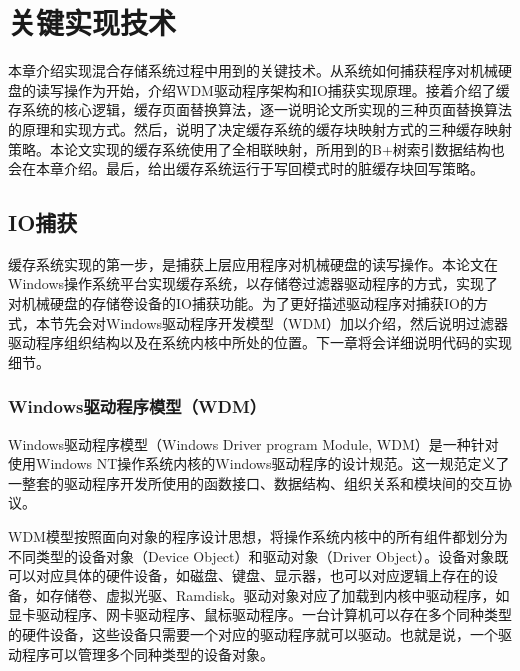 
\chapter{关键实现技术}
\label{cha:key_tech}

本章介绍实现混合存储系统过程中用到的关键技术。从系统如何捕获程序对机械硬盘的读写操作为开始，介绍WDM驱动程序架构和IO捕获实现原理。接着介绍了缓存系统的核心逻辑，缓存页面替换算法，逐一说明论文所实现的三种页面替换算法的原理和实现方式。然后，说明了决定缓存系统的缓存块映射方式的三种缓存映射策略。本论文实现的缓存系统使用了全相联映射，所用到的B+树索引数据结构也会在本章介绍。最后，给出缓存系统运行于写回模式时的脏缓存块回写策略。

\section{IO捕获}
\label{sec:capture_io}

缓存系统实现的第一步，是捕获上层应用程序对机械硬盘的读写操作。本论文在Windows操作系统平台实现缓存系统，以存储卷过滤器驱动程序的方式，实现了对机械硬盘的存储卷设备的IO捕获功能。为了更好描述驱动程序对捕获IO的方式，本节先会对Windows驱动程序开发模型（WDM）加以介绍，然后说明过滤器驱动程序组织结构以及在系统内核中所处的位置。下一章将会详细说明代码的实现细节。

\subsection{Windows驱动程序模型（WDM）}
Windows驱动程序模型（Windows Driver program Module, WDM）是一种针对使用Windows NT操作系统内核的Windows驱动程序的设计规范\cite{wdm2001}。这一规范定义了一整套的驱动程序开发所使用的函数接口、数据结构、组织关系和模块间的交互协议。

WDM模型按照面向对象的程序设计思想，将操作系统内核中的所有组件都划分为不同类型的设备对象（Device Object）和驱动对象（Driver Object）。设备对象既可以对应具体的硬件设备，如磁盘、键盘、显示器，也可以对应逻辑上存在的设备，如存储卷、虚拟光驱、Ramdisk。驱动对象对应了加载到内核中驱动程序，如显卡驱动程序、网卡驱动程序、鼠标驱动程序。一台计算机可以存在多个同种类型的硬件设备，这些设备只需要一个对应的驱动程序就可以驱动。也就是说，一个驱动程序可以管理多个同种类型的设备对象。

